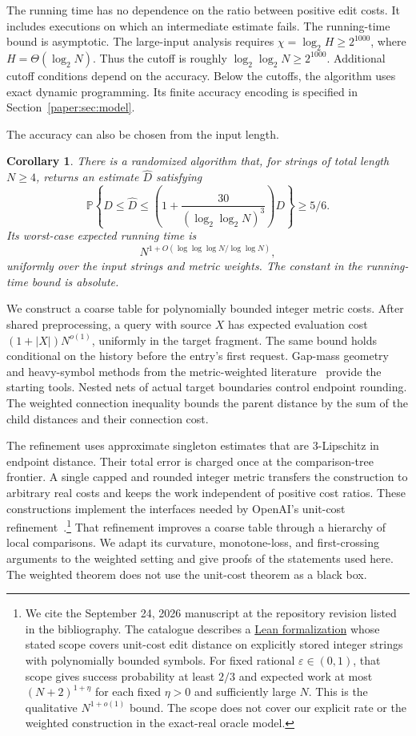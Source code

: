 \documentclass[11pt]{article}
\newtheorem{corollary}[theorem]{Corollary}
\theoremstyle{definition}
\newcommand{\Prb}{\mathbb P}
\newcommand{\1}{\mathbf 1}
\begin{document}
The running time has no dependence on the ratio between positive edit
costs. It includes executions on which an intermediate estimate fails.
The running-time bound is asymptotic. The large-input analysis requires
$\chi=\log_2H\ge2^{1000}$, where $H=\Theta(\log_2N)$.
Thus the cutoff is roughly $\log_2\log_2N\ge2^{1000}$.
Additional cutoff conditions depend on the accuracy. Below the cutoffs,
the algorithm uses exact dynamic programming. Its finite accuracy
encoding is specified in Section~\ref{paper:sec:model}.

The accuracy can also be chosen from the input length.

\begin{corollary}\label{wrapper:cor:vanishing}
There is a randomized algorithm that, for strings of total length
$N\ge4$, returns an estimate $\widehat D$ satisfying
\[
 \Prb\left\{D\le\widehat D\le
 \left(1+\frac{30}{(\log_2\log_2N)^3}\right)D\right\}\ge5/6.
\]
Its worst-case expected running time is
\[
 N^{1+O(\log\log\log N/\log\log N)},
\]
uniformly over the input strings and metric weights. The constant in
the running-time bound is absolute.
\end{corollary}

We construct a coarse table for polynomially bounded integer metric costs.
After shared preprocessing, a query with source $X$ has expected
evaluation cost $(1+|X|)N^{o(1)}$, uniformly in the target fragment.
The same bound holds conditional on the history before the entry's
first request. Gap-mass geometry and heavy-symbol methods from the
metric-weighted literature~\cite{mtw,dkk} provide the starting tools.
Nested nets of actual target boundaries control endpoint rounding.
The weighted connection inequality bounds the parent distance by the
sum of the child distances and their connection cost.

The refinement uses approximate singleton estimates that are
$3$-Lipschitz in endpoint distance.
Their total error is charged once at the comparison-tree frontier.
A single capped and rounded integer metric transfers the construction
to arbitrary real costs and keeps the work independent of positive
cost ratios.
These constructions implement the interfaces needed by OpenAI's
unit-cost refinement~\cite{openai}.\footnote{We cite the September 24,
2026 manuscript at the repository revision listed in the bibliography.
The catalogue describes a \href{https://github.com/openai/math/blob/adc7f1241b42e322a6451854ab7e4b4c146bf78a/lean/docs/121.md}{Lean formalization}
whose stated scope covers unit-cost edit distance on explicitly stored
integer strings with polynomially bounded symbols. For fixed rational
$\varepsilon\in(0,1)$, that scope gives success probability at least
$2/3$ and expected work at most $(N+2)^{1+\eta}$ for each fixed
$\eta>0$ and sufficiently large $N$. This is the qualitative
$N^{1+o(1)}$ bound. The scope does not cover our explicit rate or the
weighted construction in the exact-real oracle model.}
That refinement improves a coarse table through a hierarchy of local
comparisons. We adapt its curvature, monotone-loss, and first-crossing
arguments to the weighted setting and give proofs of the statements
used here. The weighted theorem does not use the unit-cost theorem as
a black box.
\end{document}
